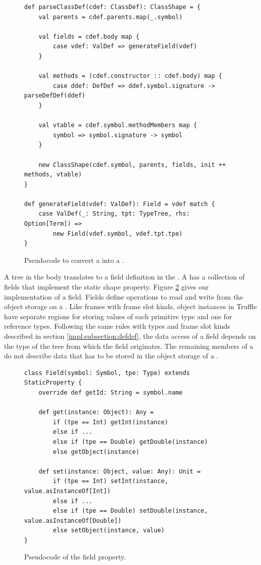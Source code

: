 \begin{figure}[!htb]
\begin{verbatim}
def parseClassDef(cdef: ClassDef): ClassShape = {
	val parents = cdef.parents.map(_.symbol)
	
	val fields = cdef.body map {
		case vdef: ValDef => generateField(vdef)	
	}
	
	val methods = (cdef.constructor :: cdef.body) map {
		case ddef: DefDef => ddef.symbol.signature -> parseDefDef(ddef)
	}
	
	val vtable = cdef.symbol.methodMembers map {
		symbol => symbol.signature -> symbol
	}

	new ClassShape(cdef.symbol, parents, fields, init ++ methods, vtable)
}

def generateField(vdef: ValDef): Field = vdef match {
	case ValDef(_: String, tpt: TypeTree, rhs: Option[Term]) => 
		new Field(vdef.symbol, vdef.tpt.tpe)
}
\end{verbatim}
\caption{Pseudocode to convert a  into a .}
\label{impl:parse-classdef}
\end{figure}

A  tree in the  body translates to a field definition in the .
A  has a collection of fields that implement the static shape property.
Figure \ref{impl:field} gives our implementation of a field.
Fields define operations to read and write from the object storage on a .
Like frames with frame slot kinds, object instances in Truffle have separate regions for storing values of each primitive type and one for reference types.
Following the same rules with types and frame slot kinds described in section \ref{impl:subsection:defdef}, the data access of a field depends on the type of the  tree from which the field originates.
The remaining members of a  do not describe data that has to be stored in the object storage of a .

\begin{figure}[!htb]
\begin{verbatim}
class Field(symbol: Symbol, tpe: Type) extends StaticProperty {
	override def getId: String = symbol.name
	
	def get(instance: Object): Any = 
		if (tpe == Int) getInt(instance)
		else if ...
		else if (tpe == Double) getDouble(instance)
		else getObject(instance)
	
	def set(instance: Object, value: Any): Unit = 
		if (tpe == Int) setInt(instance, value.asInstanceOf[Int])
		else if ...
		else if (tpe == Double) setDouble(instance, value.asInstanceOf[Double])
		else setObject(instance, value)	
} 
\end{verbatim}
\caption{Pseudocode of the field property.}
\label{impl:field}
\end{figure}

